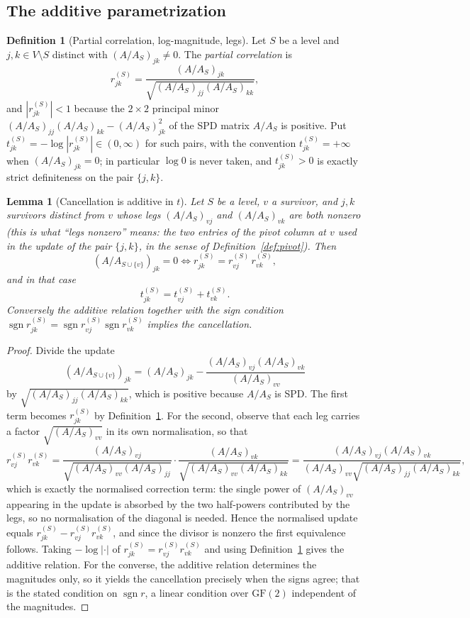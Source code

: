 \documentclass[11pt]{article}
\theoremstyle{plain}
\newtheorem{lemma}[theorem]{Lemma}
\theoremstyle{definition}
\newtheorem{definition}[theorem]{Definition}
\begin{document}
\begin{aiblock}
\subsection{The additive parametrization}

\begin{definition}[Partial correlation, log-magnitude, legs]\label{def:t}
Let $S$ be a level and $j,k\in V\setminus S$ distinct with $(A/A_S)_{jk}\neq0$. The \emph{partial
correlation} is
\[
r^{(S)}_{jk}=\frac{(A/A_S)_{jk}}{\sqrt{(A/A_S)_{jj}(A/A_S)_{kk}}},
\]
and $|r^{(S)}_{jk}|<1$ because the $2\times2$ principal minor
$(A/A_S)_{jj}(A/A_S)_{kk}-(A/A_S)_{jk}^2$ of the SPD matrix $A/A_S$ is positive. Put
$t^{(S)}_{jk}=-\log|r^{(S)}_{jk}|\in(0,\infty)$ for such pairs, with the convention
$t^{(S)}_{jk}=+\infty$ when $(A/A_S)_{jk}=0$; in particular $\log0$ is never taken, and
$t^{(S)}_{jk}>0$ is exactly strict definiteness on the pair $\{j,k\}$.
\end{definition}

\begin{lemma}[Cancellation is additive in $t$]\label{lem:additive}
Let $S$ be a level, $v$ a survivor, and $j,k$ survivors distinct from $v$ whose \emph{legs}
$(A/A_S)_{vj}$ and $(A/A_S)_{vk}$ are both nonzero (this is what ``legs nonzero'' means: the two
entries of the pivot column at $v$ used in the update of the pair $\{j,k\}$, in the sense of
Definition~\ref{def:pivot}). Then
\[
(A/A_{S\cup\{v\}})_{jk}=0
\iff r^{(S)}_{jk}=r^{(S)}_{vj}\,r^{(S)}_{vk},
\]
and in that case
\[
t^{(S)}_{jk}=t^{(S)}_{vj}+t^{(S)}_{vk}.
\]
Conversely the additive relation together with the sign condition
$\operatorname{sgn}r^{(S)}_{jk}=\operatorname{sgn}r^{(S)}_{vj}\operatorname{sgn}r^{(S)}_{vk}$ implies
the cancellation.
\end{lemma}
\begin{proof}
Divide the update
\[
  (A/A_{S\cup\{v\}})_{jk}=(A/A_S)_{jk}-\frac{(A/A_S)_{vj}(A/A_S)_{vk}}{(A/A_S)_{vv}}
\]
by $\sqrt{(A/A_S)_{jj}(A/A_S)_{kk}}$, which is positive because $A/A_S$ is SPD. The first term becomes
$r^{(S)}_{jk}$ by Definition~\ref{def:t}. For the second, observe that each leg carries a factor
$\sqrt{(A/A_S)_{vv}}$ in its own normalisation, so that
\[
  r^{(S)}_{vj}r^{(S)}_{vk}
  =\frac{(A/A_S)_{vj}}{\sqrt{(A/A_S)_{vv}(A/A_S)_{jj}}}\cdot
   \frac{(A/A_S)_{vk}}{\sqrt{(A/A_S)_{vv}(A/A_S)_{kk}}}
  =\frac{(A/A_S)_{vj}(A/A_S)_{vk}}{(A/A_S)_{vv}\sqrt{(A/A_S)_{jj}(A/A_S)_{kk}}},
\]
which is exactly the normalised correction term: the single power of $(A/A_S)_{vv}$ appearing in the
update is absorbed by the two half-powers contributed by the legs, so no normalisation of the diagonal
is needed. Hence the normalised update equals $r^{(S)}_{jk}-r^{(S)}_{vj}r^{(S)}_{vk}$, and since the
divisor is nonzero the first equivalence follows. Taking $-\log|\cdot|$ of
$r^{(S)}_{jk}=r^{(S)}_{vj}r^{(S)}_{vk}$ and using Definition~\ref{def:t} gives the additive relation.
For the converse, the additive relation determines the magnitudes only, so it yields the cancellation
precisely when the signs agree; that is the stated condition on $\operatorname{sgn}r$, a linear
condition over $\mathrm{GF}(2)$ independent of the magnitudes.
\end{proof}


\end{aiblock}
\end{document}
